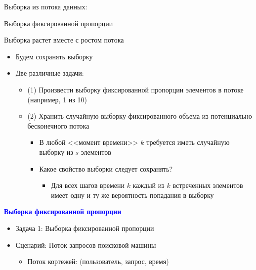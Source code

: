 \documentclass[landscape]{slides}
\begin{document}
\begin{normalsize}
\begin{slide}
Выборка из потока данных:

Выборка фиксированной пропорции

Выборка растет вместе с ростом потока
\end{slide}


\begin{slide}
\begin{itemize}
\item Будем сохранять выборку

\item Две различные задачи:

  \begin{itemize}
  \item (1) Произвести выборку фиксированной пропорции элементов в потоке (например, 1 из 10)

  \item (2) Хранить случайную выборку фиксированного объема из потенциально бесконечного потока

    \begin{itemize}
    \item В любой <<момент времени>> $k$ требуется иметь случайную выборку из $s$ элементов

    \item Какое свойство выборки следует сохранять?

      \begin{itemize}
      \item Для всех шагов времени $k$ каждый из $k$ встреченных элементов имеет одну и ту же вероятность попадания в выборку
      \end{itemize}
    \end{itemize}
  \end{itemize}
\end{itemize}
\end{slide}


\begin{slide}
\textbf{\textcolor{blue}{Выборка фиксированной пропорции}}

\begin{itemize}
\item Задача 1: Выборка фиксированной пропорции

\item Сценарий: Поток запросов поисковой машины

  \begin{itemize}
  \item Поток кортежей: (пользователь, запрос, время)


\end{itemize}
\end{itemize}
\end{slide}
\end{normalsize}
\end{document}
